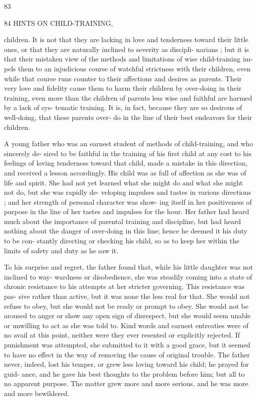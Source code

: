 \documentclass[
]{book}
\begin{document}
83

84 HINTS ON CHILD-TRAINING,

children. It is not that they are lacking in love and tenderness toward their little ones, or that they are naturally inclined to severity as discipli- narians ; but it is that their mistaken view of the methods and limitations of wise child-training im- pels them to an injudicious course of watchful strictness with their children, even while that course runs counter to their affections and desires as parents. Their very love and fidelity cause them to harm their children by over-doing in their training, even more than the children of parents less wise and faithful are harmed by a lack of sys- tematic training. It is, in fact, because they are so desirous of well-doing, that these parents over- do in the line of their best endeavors for their children.

A young father who was an earnest student of methods of child-training, and who sincerely de- sired to be faithful in the training of his first child at any cost to his feelings of loving tenderness toward that child, made a mistake in this direction, and received a lesson accordingly. His child was as full of affection as she was of life and spirit. She had not yet learned what she might do and what she might not do, but she was rapidly de- veloping impulses and tastes in various directions ; and her strength of personal character was show- ing itself in her positiveness of purpose in the line of her tastes and impulses for the hour. Her father had heard much about the importance of parental training and discipline, but had heard nothing about the danger of over-doing in this line; hence he deemed it his duty to be con- stantly directing or checking his child, so as to keep her within the limits of safety and duty as he saw it.

To his surprise and regret, the father found that, while his little daughter was not inclined to way- wardness or disobedience, she was steadily coming into a state of chronic resistance to his attempts at her stricter governing. This resistance was pas- sive rather than active, but it was none the less real for that. She would not refuse to obey, but she would not be ready or prompt to obey. She would not be aroused to anger or show any open sign of disrespect, but she would seem unable or unwilling to act as she was told to. Kind words and earnest entreaties were of no avail at this point, neither were they ever resented or explicitly rejected. If punishment was attempted, she submitted to it with a good grace, but it seemed to have no effect in the way of removing the cause of original trouble. The father never, indeed, lost his temper, or grew less loving toward his child; he prayed for guid- ance, and he gave his best thoughts to the problem before him; but all to no apparent purpose. The matter grew more and more serious, and he was more and more bewildered.
\end{document}
